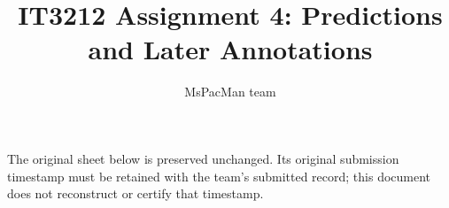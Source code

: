 \documentclass[a4paper, 11 pt]{article}
\title{IT3212 Assignment 4: Predictions and Later Annotations}
\author{MsPacMan team}\date{}
\begin{document}
\maketitle
\noindent The original sheet below is preserved unchanged. Its original submission
timestamp must be retained with the team's submitted record; this document
does not reconstruct or certify that timestamp.

\clearpage
\end{document}
